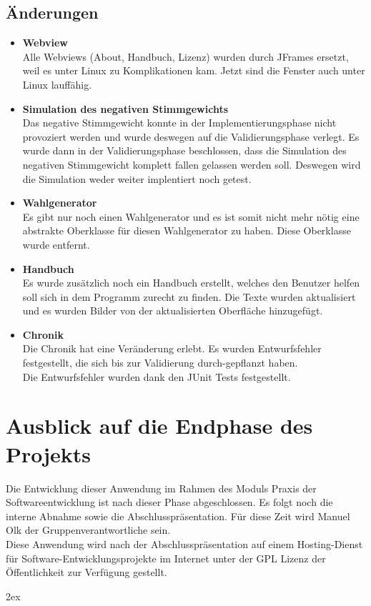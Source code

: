 \documentclass[12pt,a4paper,titlepage]{article}
\begin{document}
\subsection{Änderungen}
\begin{itemize}


\item{\bf{Webview}}\\
Alle Webviews (About, Handbuch, Lizenz) wurden durch JFrames ersetzt, weil es unter Linux zu Komplikationen kam. Jetzt sind die Fenster auch unter Linux lauffähig.\\

\item{\bf{Simulation des negativen Stimmgewichts}}\\
Das negative Stimmgewicht konnte in der Implementierungsphase nicht provoziert werden und wurde deswegen auf die Validierungsphase verlegt. Es wurde dann in der Validierungsphase beschlossen, dass die Simulation des negativen Stimmgewicht komplett fallen gelassen werden soll. Deswegen wird die Simulation weder weiter implentiert noch getest.

\item{\bf{Wahlgenerator}}\\
Es gibt nur noch einen Wahlgenerator und es ist somit nicht mehr nötig eine abstrakte Oberklasse für diesen Wahlgenerator zu haben. Diese Oberklasse wurde entfernt.

\item{\bf{Handbuch}}\\
Es wurde zusätzlich noch ein Handbuch erstellt, welches den Benutzer helfen soll sich in dem Programm zurecht zu finden. Die Texte wurden aktualisiert und es wurden Bilder von der aktualisierten Oberfläche hinzugefügt. 

\item{\bf{Chronik}}\\
Die Chronik hat eine Veränderung erlebt. Es wurden Entwurfsfehler festgestellt, die sich bis zur Validierung durch-gepflanzt haben. \\
Die Entwurfsfehler wurden dank den JUnit Tests festgestellt.

\end{itemize}

\section{Ausblick auf die Endphase des Projekts}
Die Entwicklung dieser Anwendung im Rahmen des Moduls Praxis der Softwareentwicklung ist nach dieser Phase abgeschlossen. Es folgt noch die interne Abnahme sowie die Abschlusspräsentation. Für diese Zeit wird Manuel Olk der Gruppenverantwortliche sein.\\

Diese Anwendung wird nach der Abschlusspräsentation auf einem Hosting-Dienst für Software-Entwicklungsprojekte im Internet unter der GPL Lizenz der Öffentlichkeit zur Verfügung gestellt.

\begingroup
\parindent 0pt
\parskip 2ex
\def\enotesize{\normalsize}

\endgroup
\end{document}

